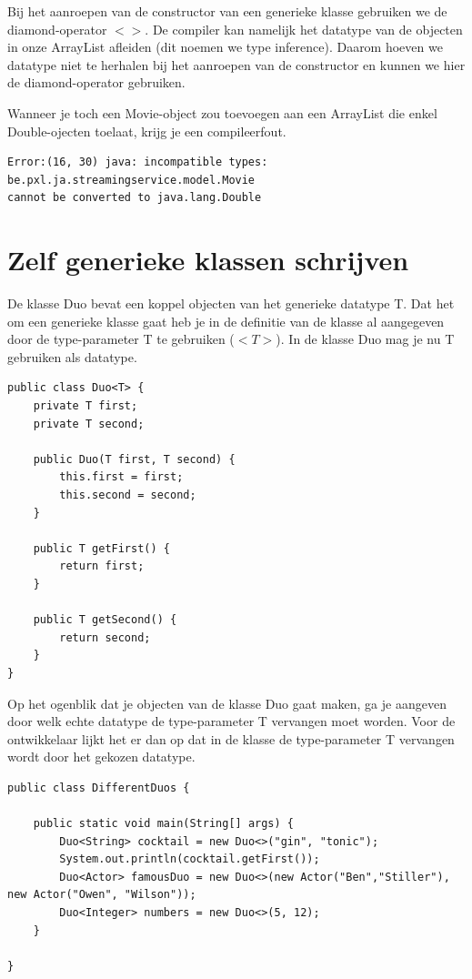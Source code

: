 \documentclass{tstextbook}
\begin{document}
Bij het aanroepen van de constructor van een generieke klasse gebruiken we de diamond-operator $<>$.
De compiler kan namelijk het datatype van de objecten in onze ArrayList afleiden (dit noemen we type inference). Daarom hoeven we datatype niet te herhalen bij het aanroepen van de constructor en kunnen we hier de diamond-operator gebruiken.

Wanneer je toch een Movie-object zou toevoegen aan een ArrayList die enkel Double-ojecten toelaat, krijg je een compileerfout.
\begin{verbatim}
Error:(16, 30) java: incompatible types: be.pxl.ja.streamingservice.model.Movie 
cannot be converted to java.lang.Double
\end{verbatim}

\section{Zelf generieke klassen schrijven}

De klasse Duo bevat een koppel objecten van het generieke datatype T. Dat het om een generieke klasse gaat heb je in de definitie van de klasse al aangegeven door de type-parameter T te gebruiken ($<T>$). In de klasse Duo mag je nu T gebruiken als datatype.

\begin{lstlisting}
public class Duo<T> {
	private T first;
	private T second;

	public Duo(T first, T second) {
		this.first = first;
		this.second = second;
	}

	public T getFirst() {
		return first;
	}

	public T getSecond() {
		return second;
	}
}
\end{lstlisting}

Op het ogenblik dat je objecten van de klasse Duo gaat maken, ga je aangeven door welk echte datatype de type-parameter T vervangen moet worden. Voor de ontwikkelaar lijkt het er dan op dat in de klasse de type-parameter T vervangen wordt door het gekozen datatype.


\begin{lstlisting}
public class DifferentDuos {

	public static void main(String[] args) {
		Duo<String> cocktail = new Duo<>("gin", "tonic");
		System.out.println(cocktail.getFirst());
		Duo<Actor> famousDuo = new Duo<>(new Actor("Ben","Stiller"), new Actor("Owen", "Wilson"));
		Duo<Integer> numbers = new Duo<>(5, 12);
	}

}
\end{lstlisting}
\end{document}
